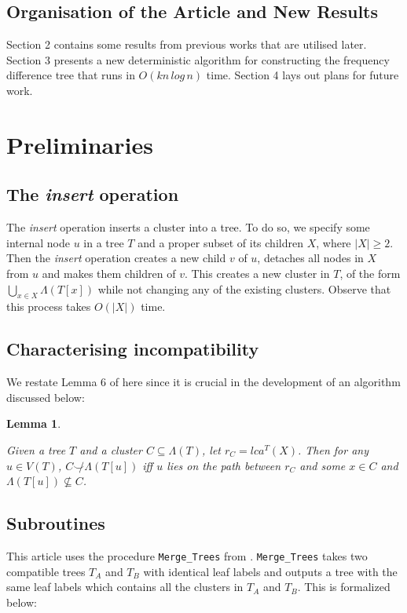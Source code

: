 \documentclass{article}
\newcommand{\compatible}{\smile}
\newcommand{\leafset}{\Lambda}
\newtheorem{incompatibility}{Lemma}
\begin{document}
    \subsection{Organisation of the Article and New Results}
    Section 2 contains some results from previous works that are utilised later. Section 3 presents a new deterministic algorithm for constructing the frequency difference tree that runs in $O(kn\,log\,n)$ time. Section 4 lays out plans for future work.

    \section{Preliminaries}

    \subsection{The \textit{insert} operation}
    The \textit{insert} operation inserts a cluster into a tree. To do so, we specify some internal node $u$ in a tree $T$ and a proper subset of its children $X$, where $|X| \geq 2$. Then the \textit{insert} operation creates a new child $v$ of $u$, detaches all nodes in $X$ from $u$ and makes them children of $v$. This creates a new cluster in $T$, of the form $\bigcup_{x \in X}\leafset(T[x])$ while not changing any of the existing clusters. Observe that this process takes $O(|X|)$ time.

    \subsection{Characterising incompatibility}
    We restate Lemma 6 of \cite{jansson2018algorithms} here since it is crucial in the development of an algorithm discussed below:

    \begin{incompatibility}
        \label{lem:incompatibility}

        Given a tree $T$ and a cluster $C \subseteq \leafset(T)$, let $r_C = lca^T(X)$. Then for any $u \in V(T)$, $C \not\compatible \leafset(T[u])$ iff $u$ lies on the path between $r_C$ and some $x \in C$ and $\leafset(T[u]) \not\subseteq C$.
    \end{incompatibility}

    \subsection{Subroutines}
    This article uses the procedure \texttt{Merge\_Trees} from \cite{jansson2016improved}. \texttt{Merge\_Trees} takes two compatible trees $T_A$ and $T_B$ with identical leaf labels and outputs a tree with the same leaf labels which contains all the clusters in $T_A$ and $T_B$. This is formalized below:
\end{document}
